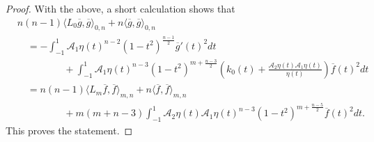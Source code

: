 \documentclass[12pt,twoside]{amsart}
\numberwithin{satz}{section}
\theoremstyle{definition}
\numberwithin{equation}{section}
\begin{document}
\begin{proof}
		With the above, a short calculation shows that
		\begin{align*}
			& n(n-1)\langle L_0\overline{g},\overline{g}\rangle_{0,n} + n\langle \overline{g},\overline{g}\rangle_{0,n} \\
			& \quad = -\int_{-1} ^1 \mathcal{A}_1\eta(t)^{n-2}(1-t^2)^{\frac{n-1}{2}}\overline{g}'(t)^2 dt \\
			& \hspace{2cm} + \int_{-1}^1 \mathcal{A}_1\eta(t)^{n-3}(1-t^2)^{m+\frac{n-3}{2}}\left(k_0(t)+\frac{\mathcal{A}_2\eta(t)\mathcal{A}_1\eta(t)}{\eta(t)}\right)\overline{f}(t)^2 dt \\
			& \quad = n(n-1)\langle L_m\overline{f},\overline{f}\rangle_{m,n}  + n\langle \overline{f},\overline{f}\rangle_{m,n}\\
			& \hspace{2cm} + m(m+n-3)\int_{-1}^1 \mathcal{A}_2\eta(t)\mathcal{A}_1\eta(t)^{n-3}(1-t^2)^{m+\frac{n-5}{2}}\overline{f}(t)^2dt.
		\end{align*}
		This proves the statement.
	\end{proof}
\end{document}
